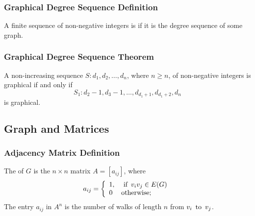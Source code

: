 \subsubsection*{Graphical Degree Sequence Definition}
A finite sequence of non-negative integers is  if it is the degree sequence of some graph.

\subsubsection*{Graphical Degree Sequence Theorem}
A non-increasing sequence $S: d_1, d_2, \ldots, d_n$, where $n \geq n$, of non-negative integers is graphical if and only if
\[
    S_1: d_2 - 1, d_3 - 1, \ldots, d_{d_1 + 1}, d_{d_1 + 2}, d_n
\]
is graphical.

\subsection{Graph and Matrices}

\subsubsection*{Adjacency Matrix Definition}
The  of $G$ is the $n \times n$ matrix $A = [a_{ij}]$, where
\[
    a_{ij} = \left\{ 
        \begin{array}{ll}
            1, & \operatorname{~\text{if}~} v_iv_j \in E(G) \\
            0 & \text{otherwise};
        \end{array}
    \right.
\]
The entry $a_{ij}$ in $A^n$ is the number of walks of length $n$ from $v_i \operatorname{~\text{to}~} v_j$.